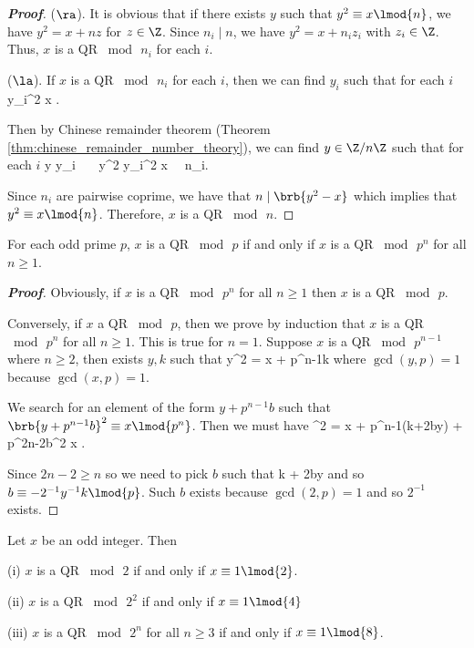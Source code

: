 \begin{proof}[\bf Proof]
($\ra$). It is obvious that if there exists $y$ such that $y^2 \equiv x \lmod{n}$, we have $y^2 = x+ nz$ for $z\in \Z$. Since $n_i \mid n$, we have $y^2 = x + n_i z_i$ with $z_i\in \Z$. Thus, $x$ is a QR $\bmod\, n_i$ for each $i$.

($\la$). If $x$ is a QR $\bmod\, n_i$ for each $i$, then we can find $y_i$ such that for each $i$
\be
y_i^2 \equiv x .
\ee

Then by Chinese remainder theorem (Theorem \ref{thm:chinese_remainder_number_theory}), we can find $y\in \Z/n\Z$ such that for each $i$
\be
y \equiv y_i  \ \ra\ \ y^2 \equiv y_i^2 \equiv x \ \ra\ n_i\mid {}.
\ee

Since $n_i$ are pairwise coprime, we have that $n\mid \brb{y^2 -x}$ which implies that $y^2 \equiv x\lmod{n}$. Therefore, $x$ is a QR $\bmod\, n$.
\end{proof}

\begin{theorem}\label{thm:hensel_lemma_number_theory}
For each odd prime $p$, $x$ is a QR $\bmod \, p$ if and only if $x$ is a QR $\bmod\, p^n$ for all $n\geq 1$.
\end{theorem}

\begin{proof}[\bf Proof]
Obviously, if $x$ is a QR $\bmod\, p^n$ for all $n\geq 1$ then $x$ is a QR $\bmod\, p$.

Conversely, if $x$ a QR $\bmod\, p$, then we prove by induction that $x$ is a QR $\bmod\, p^n$ for all $n\geq 1$. This is true for $n=1$. Suppose $x$ is a QR $\bmod\, p^{n-1}$ where $n\geq 2$, then exists $y,k$ such that
\be
y^2 =  x + p^{n-1}k
\ee
where $\gcd(y,p)=1$ because $\gcd(x,p)=1$.

We search for an element of the form $y + p^{n-1}b$ such that $\brb{y + p^{n-1}b}^2 \equiv x \lmod{p^n}$. Then we must have
\be
{}^2 = x + p^{n-1}(k+2by) + p^{2n-2}b^2 \equiv x .
\ee

Since $2n-2\geq n$ so we need to pick $b$ such that
\be
k + 2by  
\ee
and so $b \equiv - 2^{-1}y^{-1}k \lmod{p}$. Such $b$ exists because $\gcd(2,p)=1$ and so $2^{-1}$ exists.
\end{proof}

\begin{theorem}\label{thm:qr_mod_power_of_2_iff_2}
Let $x$ be an odd integer. Then
\ben
\item [(i)] $x$ is a QR $\bmod\, 2$ if and only if $x\equiv 1\lmod{2}$.
\item [(ii)] $x$ is a QR $\bmod\, 2^2$ if and only if $x\equiv 1\lmod{4}$
\item [(iii)] $x$ is a QR $\bmod\, 2^n$ for all $n\geq 3$ if and only if $x\equiv 1\lmod{8}$.
\een
\end{theorem}

